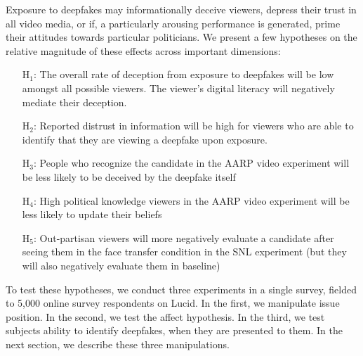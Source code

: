 Exposure to deepfakes may informationally deceive viewers, depress
their trust in all video media, or if, a particularly arousing
performance is generated, prime their attitudes towards particular
politicians. We present a few hypotheses on the relative magnitude of
these effects across important dimensions:

\begin{itemize}

\item[H$_1$:] The overall rate of deception from exposure to deepfakes
  will be low amongst all possible viewers. The viewer’s digital
  literacy will negatively mediate their deception.

\item[H$_2$:] Reported distrust in information will be high for viewers
  who are able to identify that they are viewing a deepfake upon
  exposure.

\item[H$_3$:] People who recognize the candidate in the AARP video
  experiment will be less likely to be deceived by the deepfake itself

\item[H$_4$:] High political knowledge viewers in the AARP video
  experiment will be less likely to update their beliefs

\item[H$_5$:] Out-partisan viewers will more negatively evaluate a
  candidate after seeing them in the face transfer condition in the
  SNL experiment (but they will also negatively evaluate them in
  baseline)
\end{itemize}

To test these hypotheses, we conduct three experiments in a single
survey, fielded to 5,000 online survey respondents on Lucid. In the
first, we manipulate issue position. In the second, we test the affect
hypothesis. In the third, we test subjects ability to identify
deepfakes, when they are presented to them. In the next section, we
describe these three manipulations.

